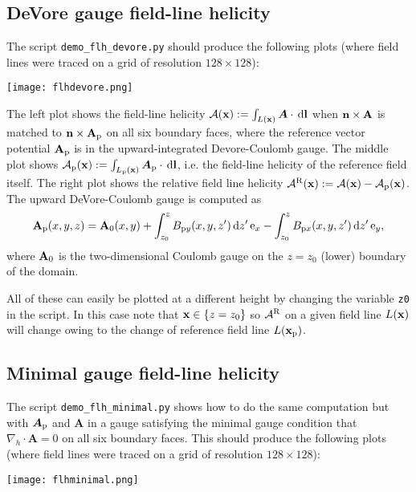 \documentclass[11pt]{article}
\newcommand{\Ab}{\boldsymbol{A}}
\begin{document}
\subsection{DeVore gauge field-line helicity}

The script \texttt{demo\_flh\_devore.py} should produce the following plots (where field lines were traced on a grid of resolution $128\times 128$): 
\begin{center}
\texttt{[image: flhdevore.png]}
\end{center}
The left plot shows the field-line helicity $\mathcal{A}({\bf x}) := \int_{L({\bf x})}\Ab\cdot\,\mathrm{d}{\bf l}$ when ${\bf n}\times{\bf A}$ is matched to ${\bf n}\times{\bf A}_{\rm p}$ on all six boundary faces, where the reference vector potential ${\bf A}_{\rm p}$ is in the upward-integrated Devore-Coulomb gauge. The middle plot shows $\mathcal{A}_{\rm p}({\bf x}) := \int_{L_{\rm p}({\bf x})}\Ab_{\rm p}\cdot\,\mathrm{d}{\bf l}$, i.e. the field-line helicity of the reference field itself. The right plot shows the relative field line helicity $\mathcal{A}^{\rm R}({\bf x}) := \mathcal{A}({\bf x}) - \mathcal{A}_{\rm p}({\bf x})$. The upward DeVore-Coulomb gauge is computed as
\begin{equation}
{\bf A}_{\rm p}(x,y,z) = {\bf A}_0(x,y) + \int_{z_0}^z B_{{\rm p}y}(x,y,z')\,\mathrm{d}z'\,\mathrm{e}_x - \int_{z_0}^z B_{{\rm p}x}(x,y,z')\,\mathrm{d}z'\,\mathrm{e}_y,
\end{equation}
where ${\bf A}_0$ is the two-dimensional Coulomb gauge on the $z=z_0$ (lower) boundary of the domain. 

All of these can easily be plotted at a different height by changing the variable \texttt{z0} in the script. In this case note that ${\bf x}\in\{z=z_0\}$ so $\mathcal{A}^{\rm R}$ on a given field line $L({\bf x})$ will change owing to the change of reference field line $L({\bf x}_{\rm p})$.

\subsection{Minimal gauge field-line helicity}

The script \texttt{demo\_flh\_minimal.py} shows how to do the same computation but with $\Ab_{\rm p}$ and $\Ab$ in a gauge satisfying the minimal gauge condition that $\nabla_h\cdot\Ab=0$ on all six boundary faces. This should produce the following plots (where field lines were traced on a grid of resolution $128\times 128$): 
\begin{center}
\texttt{[image: flhminimal.png]}
\end{center}
\end{document}

